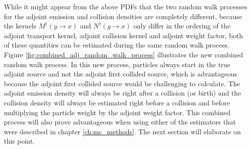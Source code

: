 While it might appear from the above PDFs that the two random walk processes
for the adjoint emission and collision densities are completely different,
because the kernels $M^{\dagger}(y \to x)$ and $N^{\dagger}(y \to x)$ only differ
in the ordering of the adjoint transport kernel, adjoint collision kernel and 
adjoint weight factor, both of these quantities can be estimated during the
same random walk process. Figure \ref{fig:combined_adj_random_walk_process}
illustrates the new combined random walk process. In this new process, 
particles always start in the true adjoint source and not the adjoint first
collided source, which is advantageous because the adjoint first collided 
source would be challenging to calculate. The adjoint emission density will
always be right after a collision (or birth) and the collision density will
always be estimated right before a collision and before multiplying the particle
weight by the adjoint weight factor. This combined process will also prove
advantageous when using either of the estimators that were described in chapter
\ref{ch:mc_methods}. The next section will elaborate on this point.
